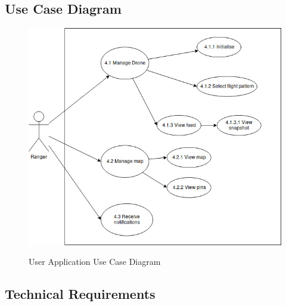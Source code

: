 \subsection{Use Case Diagram}
	\begin{center}
		\begin{figure}[h!]
			\centering
			\includegraphics[scale=0.45]{./assets/images/application-ucd.jpg}
			\label{fig: user-application-ucd }
			\caption{User Application Use Case Diagram}
		\end{figure}
	\end{center}

\subsection{Technical Requirements}
	\begin{flushleft}
	\end{flushleft}
